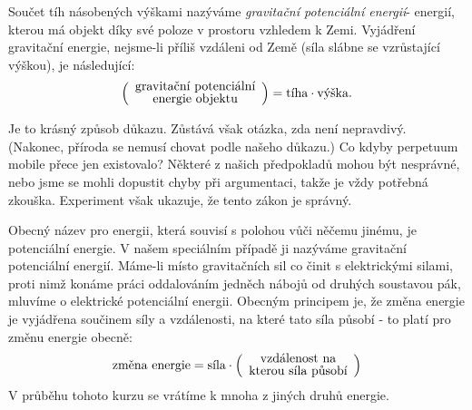 {    Součet tíh násobených výškami nazýváme \emph{gravitační potenciální energií}- energií, kterou 
    má objekt díky své poloze v prostoru vzhledem k Zemi. Vyjádření gravitační energie, nejsme-li 
    příliš vzdáleni od Země (síla slábne se vzrůstající výškou), je následující:
    \begin{equation}\label{FYZ:eq056}
      \renewcommand{\arraystretch}{0.8}
      \left(
        \begin{array}{c}
          \text{gravitační potenciální}  \\
          \text{energie objektu}
        \end{array}
      \right) =
      \text{tíha} \cdot \text{výška}.
    \end{equation}

    Je to krásný způsob důkazu. Zůstává však otázka, zda není nepravdivý. (Nakonec, příroda se 
    nemusí chovat podle našeho důkazu.) Co kdyby perpetuum mobile přece jen existovalo? Některé z 
    našich předpokladů mohou být nesprávné, nebo jsme se mohli dopustit chyby při argumentaci, 
    takže je vždy potřebná zkouška. Experiment však ukazuje, že tento zákon je správný.
    
    Obecný název pro energii, která souvisí s polohou vůči něčemu jinému, je potenciální energie. V 
    našem speciálním případě ji nazýváme gravitační potenciální energií. Máme-li místo gravitačních 
    sil co činit s elektrickými silami, proti nimž konáme práci oddalováním jedněch nábojů od 
    druhých soustavou pák, mluvíme o elektrické potenciální energii. Obecným principem je, že změna 
    energie je vyjádřena součinem síly a vzdálenosti, na které tato síla působí - to platí pro 
    změnu energie obecně:
    \begin{equation}\label{FYZ:eq057}
      \renewcommand{\arraystretch}{0.8}
      \text{změna energie} = 
      \text{síla} \cdot
      \left(
        \begin{array}{c}
          \text{vzdálenost na}  \\
          \text{kterou síla působí}
        \end{array}
      \right)
    \end{equation}
    V průběhu tohoto kurzu se vrátíme k mnoha z jiných druhů energie.

}
